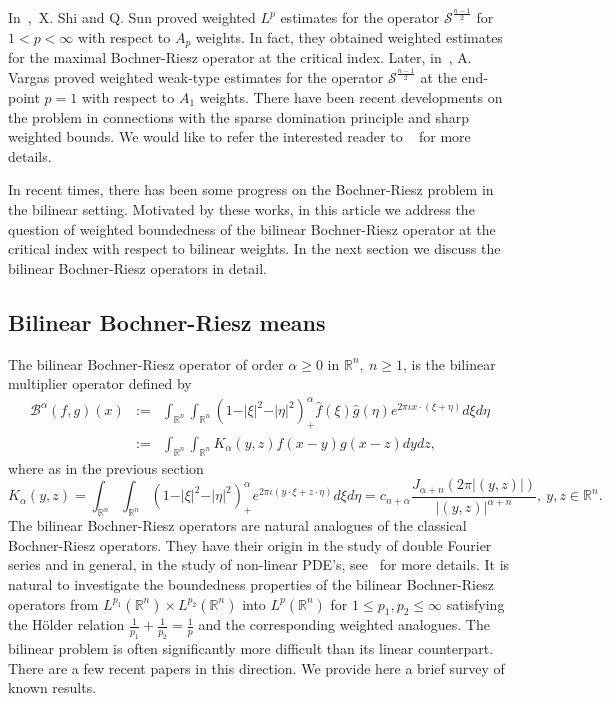 \documentclass[a4paper,12pt]{amsart}
\newcommand{\R}{{\mathbb {R}}}
\begin{document}
In~\cite{XQ},~X. Shi and Q. Sun proved  weighted $L^p$ estimates for the operator $\mathcal {S}^{\frac{n-1}{2}}$ for $1<p<\infty$ with respect to $A_p$ weights. In fact, they obtained weighted estimates for the maximal Bochner-Riesz operator at the critical index. Later, in~\cite{AV}, A. Vargas proved weighted weak-type estimates for the operator $\mathcal {S}^{\frac{n-1}{2}}$ at the end-point $p=1$ with respect to $A_1$ weights. There have been recent developments on the problem in connections with the sparse domination principle and sharp weighted bounds. We would like to refer the interested reader to ~\cite{Di} for more details.  

In recent times, there has been some progress on the Bochner-Riesz problem in the bilinear setting. Motivated by these works,  in this article we address the question of weighted boundedness of the bilinear Bochner-Riesz operator at the critical index with respect to bilinear weights. In the next section we discuss the bilinear Bochner-Riesz operators in detail. 

\subsection{Bilinear Bochner-Riesz means} 

The bilinear Bochner-Riesz operator of order  $\alpha\geq 0$ in $\R^n,~n\geq 1$, is the bilinear multiplier operator defined by  
\begin{eqnarray*}
\mathcal {B}^{\alpha}(f,g)(x)&:=&\int_{\mathbb{R}^{n}}\int_{\mathbb{R}^{n}}(1-\vert \xi\vert^{2}-\vert \eta\vert^{2})^{\alpha}_{+}\hat{f}(\xi)\hat{g}(\eta)e^{2\pi \iota x\cdot(\xi+\eta)}d\xi d\eta\\
& := &\int_{\mathbb{R}^{n}}\int_{\mathbb{R}^{n}}K_{\alpha}(y,z)f(x-y)g(x-z) dydz,
\end{eqnarray*} 
where as in the previous section 
$$K_{\alpha}(y,z)=\int_{\mathbb{R}^{n}}\int_{\mathbb{R}^{n}}(1-\vert \xi\vert^{2}-\vert \eta\vert^{2})^{\alpha}_{+}e^{2\pi \iota (y\cdot\xi+z\cdot\eta)}d\xi d\eta=c_{n+\alpha} \frac{ J_{\alpha+n} (2\pi |(y,z)|)} {|(y,z)|^{\alpha+n}},~y,z\in \R^n.$$
The bilinear Bochner-Riesz operators are natural analogues of the classical Bochner-Riesz operators. They have their origin in the study of double Fourier series and in general, in the study of non-linear PDE's, see~\cite{tao} for more details. It is natural to investigate the boundedness properties of the bilinear Bochner-Riesz operators from $L^{p_1}(\R^n)\times L^{p_2}(\R^n)$ into $L^p(\R^n)$ for $1\leq p_1,p_2\leq \infty$ satisfying the H\"{o}lder relation $\frac{1}{p_1}+\frac{1}{p_2}=\frac{1}{p}$ and the corresponding weighted analogues.  The bilinear problem is often significantly more difficult than its linear counterpart. There are a few recent papers in this direction. We provide here  a brief survey of known results. 
\end{document}
